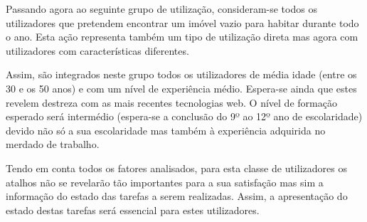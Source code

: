 Passando agora ao seguinte grupo de utilização, consideram-se todos os utilizadores que pretendem encontrar um imóvel vazio para habitar durante todo o ano. Esta ação representa também um tipo de utilização direta mas agora com utilizadores com características diferentes.

Assim, são integrados neste grupo todos os utilizadores de média idade (entre os 30 e os 50 anos) e com um nível de experiência médio. Espera-se ainda que estes revelem destreza com as mais recentes tecnologias web. O nível de formação esperado será intermédio (espera-se a conclusão do 9º ao 12º ano de escolaridade) devido não só a sua escolaridade mas também à experiência adquirida no merdado de trabalho.

Tendo em conta todos os fatores analisados, para esta classe de utilizadores os atalhos não se revelarão tão importantes para a sua satisfação mas sim a informação do estado das tarefas a serem realizadas. Assim, a apresentação do estado destas tarefas será essencial para estes utilizadores.

